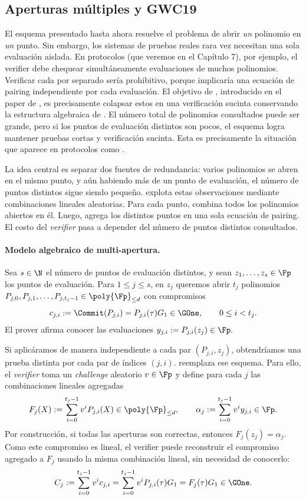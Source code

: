 \subsection{Aperturas múltiples y GWC19}

El esquema \KZG presentado hasta ahora resuelve el problema de abrir \emph{un} polinomio en \emph{un} punto. Sin embargo, los sistemas de pruebas reales rara vez necesitan una sola evaluación aislada. En protocolos \PLONKish (que veremos en el Capítulo 7), por ejemplo, el verifier debe chequear simultáneamente evaluaciones de muchos polinomios. Verificar cada \Open por separado sería prohibitivo, porque implicaría una ecuación de pairing independiente por cada evaluación. El objetivo de \GWCNineteen, introducido en el paper de \PLONK \cite{cryptoeprint:2019/953}, es precisamente colapsar estos \Open en una verificación sucinta conservando la estructura algebraica de \KZG. El número total de polinomios consultados puede ser grande, pero si los puntos de evaluación distintos son pocos, el esquema logra mantener pruebas cortas y verificación sucinta. Esta es precisamente la situación que aparece en protocolos \PLONKish como \HaloTwo.

La idea central es separar dos fuentes de redundancia: varios polinomios se abren en el mismo punto, y aún habiendo más de un punto de evaluación, el número de puntos distintos sigue siendo pequeño. \GWCNineteen explota estas observaciones mediante combinaciones lineales aleatorias. Para cada punto, combina todos los polinomios abiertos en él. Luego, agrega los distintos puntos en una sola ecuación de pairing. El costo del \textit{verifier} pasa a depender del número de puntos distintos consultados.

\paragraph{Modelo algebraico de multi-apertura.}
Sea $s \in \N$ el número de puntos de evaluación distintos, y sean $z_1, \ldots, z_s \in \Fp$ los puntos de evaluación. Para $1 \leq j \leq s$, en $z_j$ queremos abrir $t_j$ polinomios $P_{j,0}, P_{j,1}, \ldots, P_{j,t_j-1} \in \poly{\Fp}_{\leq d}$ con compromisos
$$c_{j,i} := \Commit(P_{j,i}) = P_{j,i}(\tau)G_1 \in \GOne, \qquad 0 \leq i < t_j.$$
El prover afirma conocer las evaluaciones $y_{j,i} := P_{j,i}(z_j) \in \Fp.$

Si aplicáramos \KZG de manera independiente a cada par $(P_{j,i}, z_j)$, obtendríamos una prueba distinta por cada par de índices $(j, i)$. \GWCNineteen reemplaza ese esquema. Para ello, el \textit{verifier} toma un \textit{challenge} aleatorio $v \in \Fp$ y define para cada $j$ las combinaciones lineales agregadas
$$F_j(X) := \sum_{i=0}^{t_j-1} v^i P_{j,i}(X) \in \poly{\Fp}_{\leq d}, \qquad \alpha_j := \sum_{i=0}^{t_j-1} v^i y_{j,i} \in \Fp.$$
Por construcción, si todas las aperturas son correctas, entonces $F_j(z_j) = \alpha_j$. Como este compromiso es lineal, el verifier puede reconstruir el compromiso agregado a $F_j$ usando la misma combinación lineal, sin necesidad de conocerlo:
$$C_j := \sum_{i=0}^{t_j-1} v^i c_{j,i} = \sum_{i=0}^{t_j-1} v^i P_{j,i}(\tau)G_1 = F_j(\tau)G_1 \in \GOne.$$

